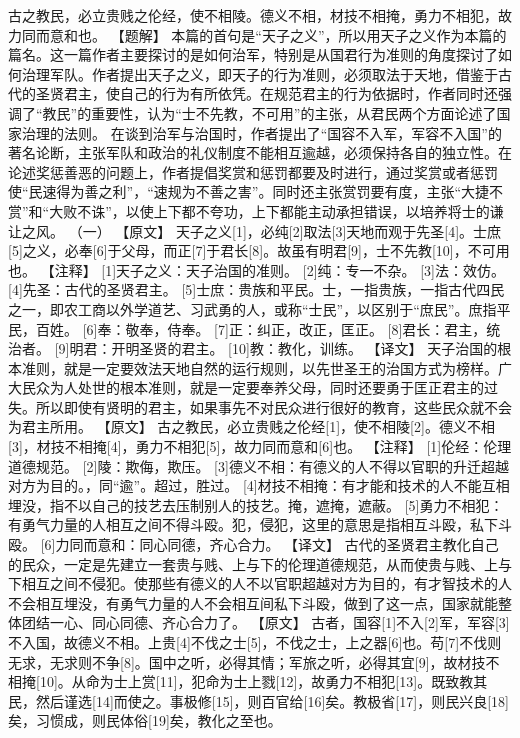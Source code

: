\documentclass[a4paper,12pt,UTF8,twoside]{ctexbook}
\begin{document}
古之教民，必立贵贱之伦经，使不相陵。德义不相，材技不相掩，勇力不相犯，故力同而意和也。
【题解】
本篇的首句是“天子之义”，所以用天子之义作为本篇的篇名。这一篇作者主要探讨的是如何治军，特别是从国君行为准则的角度探讨了如何治理军队。作者提出天子之义，即天子的行为准则，必须取法于天地，借鉴于古代的圣贤君主，使自己的行为有所依凭。在规范君主的行为依据时，作者同时还强调了“教民”的重要性，认为“士不先教，不可用”的主张，从君民两个方面论述了国家治理的法则。
在谈到治军与治国时，作者提出了“国容不入军，军容不入国”的著名论断，主张军队和政治的礼仪制度不能相互逾越，必须保持各自的独立性。在论述奖惩善恶的问题上，作者提倡奖赏和惩罚都要及时进行，通过奖赏或者惩罚使“民速得为善之利”，“速规为不善之害”。同时还主张赏罚要有度，主张“大捷不赏”和“大败不诛”，以使上下都不夸功，上下都能主动承担错误，以培养将士的谦让之风。
（一）
【原文】
天子之义[1]，必纯[2]取法[3]天地而观于先圣[4]。士庶[5]之义，必奉[6]于父母，而正[7]于君长[8]。故虽有明君[9]，士不先教[10]，不可用也。
【注释】
[1]天子之义：天子治国的准则。
[2]纯：专一不杂。
[3]法：效仿。
[4]先圣：古代的圣贤君主。
[5]士庶：贵族和平民。士，一指贵族，一指古代四民之一，即农工商以外学道艺、习武勇的人，或称“士民”，以区别于“庶民”。庶指平民，百姓。
[6]奉：敬奉，侍奉。
[7]正：纠正，改正，匡正。
[8]君长：君主，统治者。
[9]明君：开明圣贤的君主。
[10]教：教化，训练。
【译文】
天子治国的根本准则，就是一定要效法天地自然的运行规则，以先世圣王的治国方式为榜样。广大民众为人处世的根本准则，就是一定要奉养父母，同时还要勇于匡正君主的过失。所以即使有贤明的君主，如果事先不对民众进行很好的教育，这些民众就不会为君主所用。
【原文】
古之教民，必立贵贱之伦经[1]，使不相陵[2]。德义不相[3]，材技不相掩[4]，勇力不相犯[5]，故力同而意和[6]也。
【注释】
[1]伦经：伦理道德规范。
[2]陵：欺侮，欺压。
[3]德义不相：有德义的人不得以官职的升迁超越对方为目的。，同“逾”。超过，胜过。
[4]材技不相掩：有才能和技术的人不能互相埋没，指不以自己的技艺去压制别人的技艺。掩，遮掩，遮蔽。
[5]勇力不相犯：有勇气力量的人相互之间不得斗殴。犯，侵犯，这里的意思是指相互斗殴，私下斗殴。
[6]力同而意和：同心同德，齐心合力。
【译文】
古代的圣贤君主教化自己的民众，一定是先建立一套贵与贱、上与下的伦理道德规范，从而使贵与贱、上与下相互之间不侵犯。使那些有德义的人不以官职超越对方为目的，有才智技术的人不会相互埋没，有勇气力量的人不会相互间私下斗殴，做到了这一点，国家就能整体团结一心、同心同德、齐心合力了。
【原文】
古者，国容[1]不入[2]军，军容[3]不入国，故德义不相。上贵[4]不伐之士[5]，不伐之士，上之器[6]也。苟[7]不伐则无求，无求则不争[8]。国中之听，必得其情；军旅之听，必得其宜[9]，故材技不相掩[10]。从命为士上赏[11]，犯命为士上戮[12]，故勇力不相犯[13]。既致教其民，然后谨选[14]而使之。事极修[15]，则百官给[16]矣。教极省[17]，则民兴良[18]矣，习惯成，则民体俗[19]矣，教化之至也。
\end{document}
